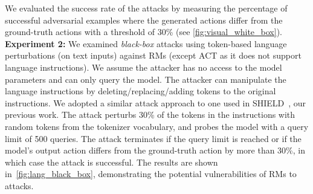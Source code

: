 \documentclass[11pt,letterpaper]{article}
\begin{document}
We evaluated the success rate of the attacks by measuring the percentage of successful adversarial examples where the generated actions differ from the ground-truth actions with a threshold of 30\% (see \autoref{fig:visual_white_box}). %
\\
\textbf{Experiment 2:} We examined \emph{black-box} attacks using token-based language perturbations (\ie on text inputs) against RMs (except ACT as it does not support language instructions). We assume the attacker has no access to the model parameters and can only query the model. The attacker can manipulate the language instructions by deleting/replacing/adding tokens to the original instructions.
We adopted a similar attack approach to one used in SHIELD~\cite{abuhamad2025shield}, our previous work. %
The attack perturbs 30\% of the tokens in the instructions with random tokens from the tokenizer vocabulary, and probes the model with a query limit of 500 queries. The attack terminates if the query limit is reached or if the model's output action differs from the ground-truth action by more than 30\%, in which case the attack is successful.
The results are shown
 in~\autoref{fig:lang_black_box}, demonstrating the potential vulnerabilities of RMs to attacks. %
\end{document}
